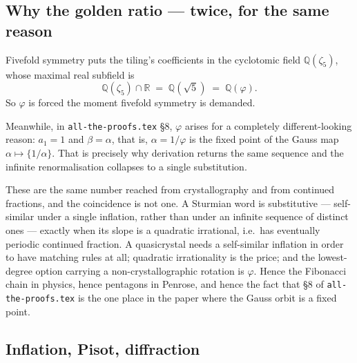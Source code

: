 \documentclass[11pt,a4paper]{article}
\newcommand{\Q}{\mathbb{Q}}
\newcommand{\R}{\mathbb{R}}
\theoremstyle{definition}
\theoremstyle{plain}
\begin{document}
\subsection{Why the golden ratio --- twice, for the same reason}

Fivefold symmetry puts the tiling's coefficients in the cyclotomic field
$\Q(\zeta_5)$, whose maximal real subfield is
\[
  \Q(\zeta_5) \cap \R \;=\; \Q(\sqrt 5) \;=\; \Q(\varphi) .
\]
So $\varphi$ is forced the moment fivefold symmetry is demanded.

Meanwhile, in \texttt{all-the-proofs.tex} \S8, $\varphi$ arises for a
completely different-looking reason: $a_1 = 1$ and $\beta = \alpha$, that is,
$\alpha = 1/\varphi$ is the fixed point of the Gauss map
$\alpha \mapsto \{1/\alpha\}$. That is precisely why derivation returns the same
sequence and the infinite renormalisation collapses to a single substitution.

These are the same number reached from crystallography and from continued
fractions, and the coincidence is not one. A Sturmian word is substitutive ---
self-similar under a single inflation, rather than under an infinite sequence of
distinct ones --- exactly when its slope is a quadratic irrational, i.e.\ has
eventually periodic continued fraction. A quasicrystal needs a self-similar
inflation in order to have matching rules at all; quadratic irrationality is
the price; and the lowest-degree option carrying a non-crystallographic rotation
is $\varphi$. Hence the Fibonacci chain in physics, hence pentagons in Penrose,
and hence the fact that \S8 of \texttt{all-the-proofs.tex} is the one place in
the paper where the Gauss orbit is a fixed point.

\subsection{Inflation, Pisot, diffraction}
\end{document}
